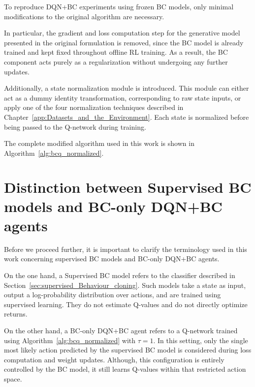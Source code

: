 To reproduce DQN+BC experiments using frozen BC models, only minimal modifications to the original algorithm are necessary.

In particular, the gradient and loss computation step for the generative model presented in the original formulation is removed, since the BC model is already trained and kept fixed throughout offline RL training. As a result, the BC component acts purely as a regularization without undergoing any further updates.

Additionally, a state normalization module is introduced. This module can either act as a dummy identity transformation, corresponding to raw state inputs, or apply one of the four normalization techniques described in Chapter~\ref{app:Datasets_and_the_Environment}. Each state is normalized before being passed to the Q-network during training.

The complete modified algorithm used in this work is shown in Algorithm~\ref{alg:bcq_normalized}.










\section{Distinction between Supervised BC models and BC-only DQN+BC agents}
\label{sec:distinction_between_supervised_bc_models_and_BC_only_DQN_BC_agents}

Before we proceed further, it is important to clarify the terminology used in this work concerning supervised BC models and BC-only DQN+BC agents.

On the one hand, a Supervised BC model refers to the classifier described in Section~\ref{sec:supervised_Behaviour_cloning}. Such models take a state as input, output a log-probability distribution over actions, and are trained using supervised learning. They do not estimate Q-values and do not directly optimize returns.

On the other hand, a BC-only DQN+BC agent refers to a Q-network trained using Algorithm~\ref{alg:bcq_normalized} with $\tau=1$. In this setting, only the single most likely action predicted by the supervised BC model is considered during loss computation and weight updates. Although, this configuration is entirely controlled by the BC model, it still learns Q-values within that restricted action space.





